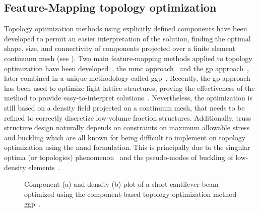 \subsection{Feature-Mapping topology optimization}
Topology optimization methods using explicitly defined components have been developed to permit an easier interpretation of the solution, finding the optimal shape, size, and connectivity of components projected over a finite element continuum mesh (see ). Two main feature-mapping methods applied to topology optimization have been developed~, the \gls{mmc} approach~
and the \gls{gp} approach~, later combined in a unique methodology called \gls{ggp}~. Recently, the \gls{gp} approach has been used to optimize light lattice structures, proving the effectiveness of the method to provide easy-to-interpret solutions~. Nevertheless, the optimization is still based on a density field projected on a continuum mesh, that needs to be refined to correctly discretize low-volume fraction structures. Additionally, truss structure design naturally depends on constraints on maximum allowable stress and buckling which are all known for being difficult to implement on topology optimization using the \gls{nand} formulation. This is principally due to the singular optima (or topologies) phenomenon~ and the pseudo-modes of buckling of low-density elements~. \begin{figure}
    \hspace*{\fill}
    \hfill
    \hspace*{\fill}
    \caption{Component (a) and density (b) plot of a short cantilever beam optimized using the component-based topology optimization method \gls{ggp}~\cite{coniglio_generalized_2020}.}
    \label{fig:03_to_component}
\end{figure}

